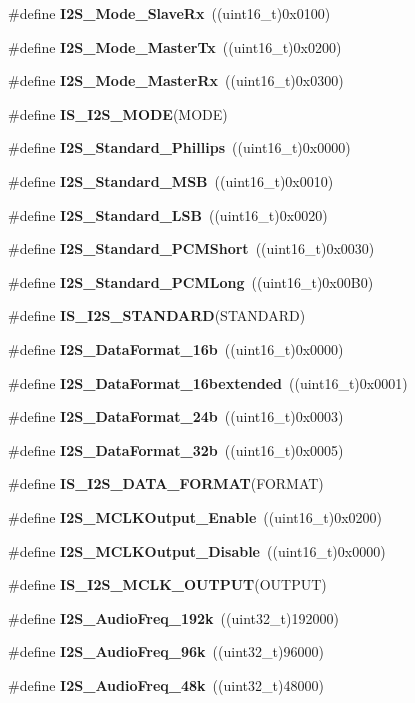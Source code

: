 \begin{DoxyCompactItemize}
\#define \textbf{ I2\+S\+\_\+\+Mode\+\_\+\+Slave\+Rx}~((uint16\+\_\+t)0x0100)
\item 
\#define \textbf{ I2\+S\+\_\+\+Mode\+\_\+\+Master\+Tx}~((uint16\+\_\+t)0x0200)
\item 
\#define \textbf{ I2\+S\+\_\+\+Mode\+\_\+\+Master\+Rx}~((uint16\+\_\+t)0x0300)
\item 
\#define \textbf{ I\+S\+\_\+\+I2\+S\+\_\+\+M\+O\+DE}(M\+O\+DE)
\item 
\#define \textbf{ I2\+S\+\_\+\+Standard\+\_\+\+Phillips}~((uint16\+\_\+t)0x0000)
\item 
\#define \textbf{ I2\+S\+\_\+\+Standard\+\_\+\+M\+SB}~((uint16\+\_\+t)0x0010)
\item 
\#define \textbf{ I2\+S\+\_\+\+Standard\+\_\+\+L\+SB}~((uint16\+\_\+t)0x0020)
\item 
\#define \textbf{ I2\+S\+\_\+\+Standard\+\_\+\+P\+C\+M\+Short}~((uint16\+\_\+t)0x0030)
\item 
\#define \textbf{ I2\+S\+\_\+\+Standard\+\_\+\+P\+C\+M\+Long}~((uint16\+\_\+t)0x00\+B0)
\item 
\#define \textbf{ I\+S\+\_\+\+I2\+S\+\_\+\+S\+T\+A\+N\+D\+A\+RD}(S\+T\+A\+N\+D\+A\+RD)
\item 
\#define \textbf{ I2\+S\+\_\+\+Data\+Format\+\_\+16b}~((uint16\+\_\+t)0x0000)
\item 
\#define \textbf{ I2\+S\+\_\+\+Data\+Format\+\_\+16bextended}~((uint16\+\_\+t)0x0001)
\item 
\#define \textbf{ I2\+S\+\_\+\+Data\+Format\+\_\+24b}~((uint16\+\_\+t)0x0003)
\item 
\#define \textbf{ I2\+S\+\_\+\+Data\+Format\+\_\+32b}~((uint16\+\_\+t)0x0005)
\item 
\#define \textbf{ I\+S\+\_\+\+I2\+S\+\_\+\+D\+A\+T\+A\+\_\+\+F\+O\+R\+M\+AT}(F\+O\+R\+M\+AT)
\item 
\#define \textbf{ I2\+S\+\_\+\+M\+C\+L\+K\+Output\+\_\+\+Enable}~((uint16\+\_\+t)0x0200)
\item 
\#define \textbf{ I2\+S\+\_\+\+M\+C\+L\+K\+Output\+\_\+\+Disable}~((uint16\+\_\+t)0x0000)
\item 
\#define \textbf{ I\+S\+\_\+\+I2\+S\+\_\+\+M\+C\+L\+K\+\_\+\+O\+U\+T\+P\+UT}(O\+U\+T\+P\+UT)
\item 
\#define \textbf{ I2\+S\+\_\+\+Audio\+Freq\+\_\+192k}~((uint32\+\_\+t)192000)
\item 
\#define \textbf{ I2\+S\+\_\+\+Audio\+Freq\+\_\+96k}~((uint32\+\_\+t)96000)
\item 
\#define \textbf{ I2\+S\+\_\+\+Audio\+Freq\+\_\+48k}~((uint32\+\_\+t)48000)

\end{DoxyCompactItemize}
